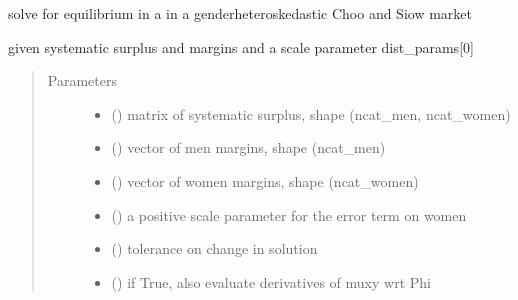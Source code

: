 \documentclass[letterpaper,10pt,english]{sphinxmanual}
\begin{document}
\begin{fulllineitems}
\label{\detokenize{ipfp_solvers:ipfp_solvers.ipfp_hetero_solver}}
solve for equilibrium in a  in a gender\sphinxhyphen{}heteroskedastic Choo and Siow market

given systematic surplus and margins and a scale parameter dist\_params{[}0{]}
\begin{quote}\begin{description}
\item[{Parameters}] \leavevmode\begin{itemize}
\item {} 
 () \textendash{} matrix of systematic surplus, shape (ncat\_men, ncat\_women)

\item {} 
 () \textendash{} vector of men margins, shape (ncat\_men)

\item {} 
 () \textendash{} vector of women margins, shape (ncat\_women)

\item {} 
 () \textendash{} a positive scale parameter for the error term on women

\item {} 
 () \textendash{} tolerance on change in solution

\item {} 
 () \textendash{} if True, also evaluate derivatives of muxy wrt Phi


\end{itemize}
\end{description}
\end{quote}
\end{fulllineitems}
\end{document}
